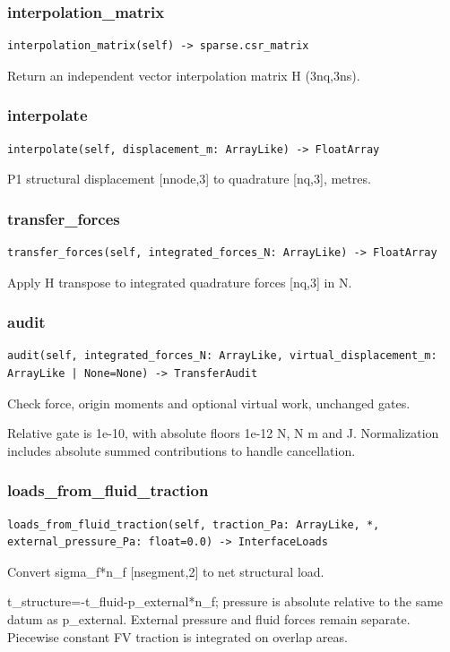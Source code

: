 \subsubsection*{interpolation\_matrix}
\begin{lstlisting}
interpolation_matrix(self) -> sparse.csr_matrix
\end{lstlisting}
Return an independent vector interpolation matrix H (3nq,3ns).
\subsubsection*{interpolate}
\begin{lstlisting}
interpolate(self, displacement_m: ArrayLike) -> FloatArray
\end{lstlisting}
P1 structural displacement [nnode,3] to quadrature [nq,3], metres.
\subsubsection*{transfer\_forces}
\begin{lstlisting}
transfer_forces(self, integrated_forces_N: ArrayLike) -> FloatArray
\end{lstlisting}
Apply H transpose to integrated quadrature forces [nq,3] in N.
\subsubsection*{audit}
\begin{lstlisting}
audit(self, integrated_forces_N: ArrayLike, virtual_displacement_m: ArrayLike | None=None) -> TransferAudit
\end{lstlisting}
Check force, origin moments and optional virtual work, unchanged gates.\par Relative gate is 1e-10, with absolute floors 1e-12 N, N m and J. Normalization includes absolute summed contributions to handle cancellation.
\subsubsection*{loads\_from\_fluid\_traction}
\begin{lstlisting}
loads_from_fluid_traction(self, traction_Pa: ArrayLike, *, external_pressure_Pa: float=0.0) -> InterfaceLoads
\end{lstlisting}
Convert sigma\_f*n\_f [nsegment,2] to net structural load.\par t\_structure=-t\_fluid-p\_external*n\_f; pressure is absolute relative to the same datum as p\_external. External pressure and fluid forces remain separate. Piecewise constant FV traction is integrated on overlap areas.
